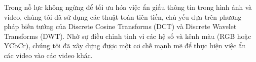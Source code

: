 
Trong nỗ lực không ngừng để tối ưu hóa việc ẩn giấu thông tin trong hình ảnh và video, chúng tôi đã sử dụng các thuật toán tiên tiến, chủ yếu dựa trên phương pháp biến tướng của Discrete Cosine Transforms (DCT) và Discrete Wavelet Transforms (DWT). Nhờ sự điều chỉnh tinh vi các hệ số và kênh màu (RGB hoặc YCbCr), chúng tôi đã xây dựng được một cơ chế mạnh mẽ để thực hiện việc ẩn các video vào các video khác.

